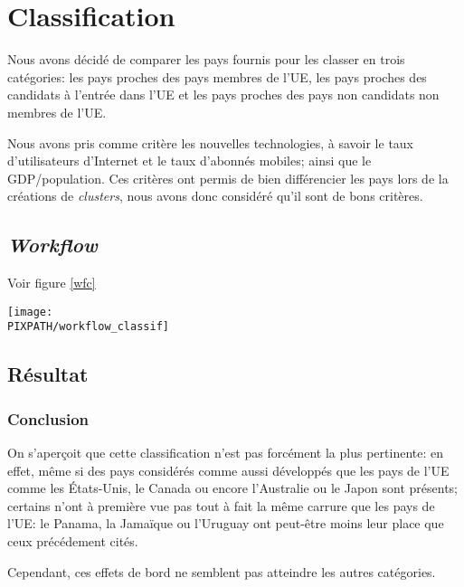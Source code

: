 \vfil
\pagebreak
\section{Classification}

Nous avons décidé de comparer les pays fournis pour
les classer en trois catégories: les pays proches des pays
membres de l'UE, les pays proches des candidats à l'entrée
dans l'UE et les pays proches des pays non candidats non
membres de l'UE.

Nous avons pris comme critère les nouvelles technologies, à savoir
le taux d'utilisateurs d'Internet et le taux d'abonnés mobiles; ainsi
que le GDP/population.
Ces critères ont permis de bien différencier les pays lors de la
créations de {\sl clusters}, nous avons donc considéré qu'il
sont de bons critères.

\subsection{{\sl Workflow}}
Voir figure \ref{wfc}

\begin{sidewaysfigure}[!h]
\begin{center}
    \caption{{\sl Workflow} classification}
    \texttt{[image: \\PIXPATH/workflow\_classif]}
\label{wfc}
\end{center}
\end{sidewaysfigure}


\subsection{Résultat}



\subsubsection{Conclusion}

On s'aperçoit que cette classification n'est pas forcément
la plus pertinente: en effet, même si des pays considérés comme
aussi développés que les pays de l'UE comme les États-Unis, le Canada
ou encore l'Australie ou le Japon sont présents; certains n'ont à première vue pas
tout à fait la même carrure que les pays de l'UE: le Panama, la Jamaïque
ou l'Uruguay ont peut-être moins leur place que ceux précédement cités. 

Cependant, ces effets de bord ne semblent pas atteindre les autres
catégories.
